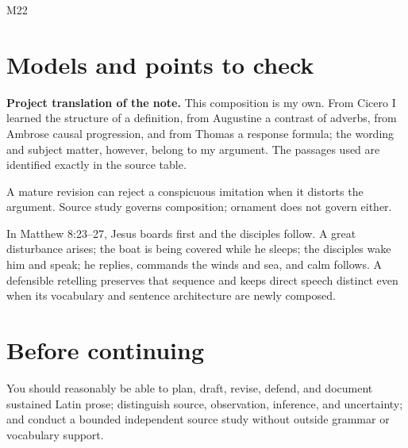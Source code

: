 \begin{courseunit}{M22}
\ifsolutions
\section{Models and points to check}
\textbf{Project translation of the note.} This composition is my own. From
Cicero I learned the structure of a definition, from Augustine a contrast of
adverbs, from Ambrose causal progression, and from Thomas a response formula;
the wording and subject matter, however, belong to my argument. The passages
used are identified exactly in the source table.

A mature revision can reject a conspicuous imitation when it distorts the
argument.  Source study governs composition; ornament does not govern either.

In Matthew 8:23--27, Jesus boards first and the disciples follow.  A great
disturbance arises; the boat is being covered while he sleeps; the disciples
wake him and speak; he replies, commands the winds and sea, and calm follows.
A defensible retelling preserves that sequence and keeps direct speech
distinct even when its vocabulary and sentence architecture are newly
composed.
\else
\section{Before continuing}
You should reasonably be able to plan, draft, revise, defend, and document
sustained Latin prose; distinguish source, observation, inference, and
uncertainty; and conduct a bounded independent source study without outside
grammar or vocabulary support.
\fi
\end{courseunit}
